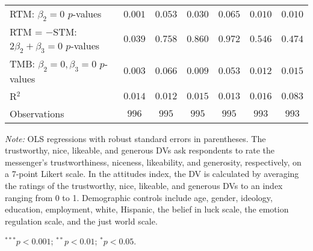 \begin{table}[!t]
\begin{center}
{\begin{threeparttable}
\begin{tabular}{l c c c c c c}
RTM: $\beta_2 = 0$ $p$-values                   & $0.001$       & $0.053$       & $0.030$       & $0.065$       & $0.010$       & $0.010$       \\
RTM = $-$STM: $2\beta_2+\beta_3 = 0$ $p$-values & $0.039$       & $0.758$       & $0.860$       & $0.972$       & $0.546$       & $0.474$       \\
TMB: $\beta_2 = 0, \beta_3 = 0$ $p$-values      & $0.003$       & $0.066$       & $0.009$       & $0.053$       & $0.012$       & $0.015$       \\
R$^2$                                           & $0.014$       & $0.012$       & $0.015$       & $0.013$       & $0.016$       & $0.083$       \\
Observations                                    & $996$         & $995$         & $995$         & $995$         & $993$         & $993$         \\
\bottomrule
\end{tabular}
\begin{tablenotes}[flushleft]
\scriptsize{\item[\hspace{-5mm}] \textit{Note:} OLS regressions with robust standard errors in parentheses. 
            The trustworthy, nice, likeable, and generous DVs ask respondents to rate the messenger's trustworthiness, niceness, likeability, and generosity, respectively,
on a 7-point Likert scale. In the attitudes index, the DV is calculated by averaging the ratings of the trustworthy, nice, likeable, and generous DVs to an index ranging from 0 to 1. 
                                Demographic controls include age, gender, ideology,
                                education, employment, white, Hispanic, the belief in luck scale, the emotion regulation scale, and the just world scale. \item[\hspace{-5mm}] $^{***}p<0.001$; $^{**}p<0.01$; $^{*}p<0.05$.}
\end{tablenotes}
\end{threeparttable}
}
\label{tab:attitude_opposite_regression}
\end{center}
\end{table}

\renewcommand{\baselinestretch}{1.67}%
